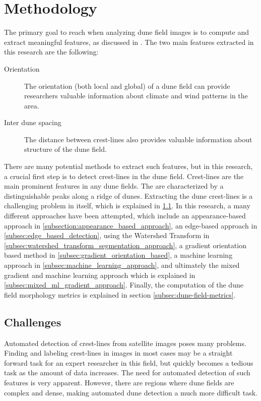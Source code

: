 \section{Methodology} \label{sec:methodology}
The primary goal to reach when analyzing dune field images is to compute and extract meaningful features, as discussed in \cite{ewing-kocurek-lake-2006,ewing-peyret-kocurek-bourke-2010}. The two main features extracted in this research are the following:

 \begin{description}
 	\item [Orientation] The orientation (both local and global) of a dune field can provide researchers valuable information about climate and wind patterns in the area.
 	\item [Inter dune spacing] The distance between crest-lines also provides valuable information about structure of the dune field.
 \end{description}
 
 There are many potential methods to extract such features, but in this research, a crucial first step is to detect crest-lines in the dune field. Crest-lines are the main prominent features in any dune fields. The are characterized by a distinguishable peaks along a ridge of dunes. Extracting the dune crest-lines is a challenging problem in itself, which is explained in \ref{subsec:challenges}. In this research, a many different approaches have been attempted, which include an appearance-based approach in \ref{subsection:appearance_based_approach}, an edge-based approach in \ref{subsec:edge_based_detection}, using the Watershed Transform in \ref{subsec:watershed_transform_segmentation_approach}, a gradient orientation based method in \ref{subsec:gradient_orientation_based}, a machine learning approach in \ref{subsec:machine_learning_approach}, and ultimately the mixed gradient and machine learning approach which is explained in \ref{subsec:mixed_ml_gradient_approach}. Finally, the computation of the dune field morphology metrics is explained in section \ref{subsec:dune-field-metrics}.
 
 \subsection{Challenges} \label{subsec:challenges}
 
 Automated detection of crest-lines from satellite images poses many problems. Finding and labeling crest-lines in images in most cases may be a straight forward task for an expert researcher in this field, but quickly becomes a tedious task as the amount of data increases. The need for automated detection of such features is very apparent. However, there are regions where dune fields are complex and dense, making automated dune detection a much more difficult task.
 
